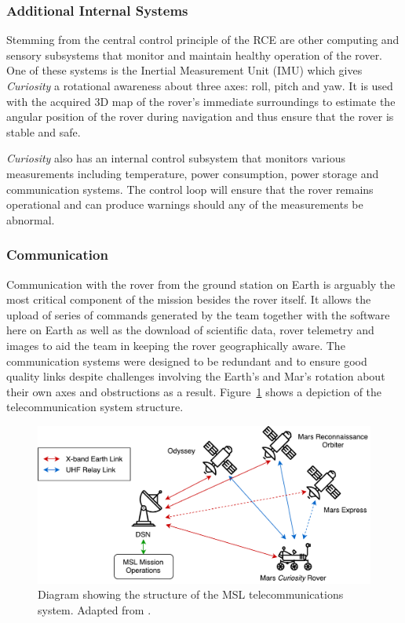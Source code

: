       \subsubsection{Additional Internal Systems}
        Stemming from the central control principle of the RCE are other computing and sensory subsystems that monitor and maintain healthy operation of the rover. One of these systems is the Inertial Measurement Unit (IMU) which gives \textit{Curiosity} a rotational awareness about three axes: roll, pitch and yaw. It is used with the acquired 3D map of the rover's immediate surroundings to estimate the angular position of the rover during navigation and thus ensure that the rover is stable and safe.
        
        \textit{Curiosity} also has an internal control subsystem that monitors various measurements including temperature, power consumption, power storage and communication systems. The control loop will ensure that the rover remains operational and can produce warnings should any of the measurements be abnormal.
               
      \subsubsection{Communication}
        Communication with the rover from the ground station on Earth is arguably the most critical component of the mission besides the rover itself. It allows the upload of series of commands generated by the team together with the software here on Earth as well as the download of scientific data, rover telemetry and images to aid the team in keeping the rover geographically aware. The communication systems were designed to be redundant and to ensure good quality links despite challenges involving the Earth's and Mar's rotation about their own axes and obstructions as a result. Figure~\ref{fig:litreview-telecomsstructure} shows a depiction of the telecommunication system structure.
        
        \begin{figure}[h]
          \centering
          \includegraphics[width=0.71\linewidth]{figures/litreview-telecomsStructure}
          \caption[Diagram showing the structure of the MSL telecommunications system]{Diagram showing the structure of the MSL telecommunications system. Adapted from \cite{fig:litreview-telecomsstructure_cite}.}
          \label{fig:litreview-telecomsstructure}
        \end{figure}

